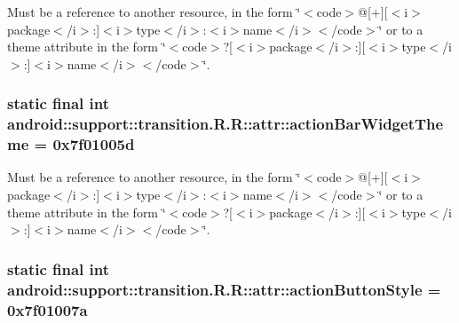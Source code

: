 Must be a reference to another resource, in the form \char`\"{}$<$code$>$@\mbox{[}+\mbox{]}\mbox{[}$<$i$>$package$<$/i$>$:\mbox{]}$<$i$>$type$<$/i$>$:$<$i$>$name$<$/i$>$$<$/code$>$\char`\"{} or to a theme attribute in the form \char`\"{}$<$code$>$?\mbox{[}$<$i$>$package$<$/i$>$:\mbox{]}\mbox{[}$<$i$>$type$<$/i$>$:\mbox{]}$<$i$>$name$<$/i$>$$<$/code$>$\char`\"{}. \hypertarget{classandroid_1_1support_1_1transition_1_1_r_1_1attr_79c3a0b3af1dfeaa7ed9bc597c8f0468}{
\subsubsection[{actionBarWidgetTheme}]{\setlength{\rightskip}{0pt plus 5cm}static final int android::support::transition.R.R::attr::actionBarWidgetTheme = 0x7f01005d}}
\label{classandroid_1_1support_1_1transition_1_1_r_1_1attr_79c3a0b3af1dfeaa7ed9bc597c8f0468}


Must be a reference to another resource, in the form \char`\"{}$<$code$>$@\mbox{[}+\mbox{]}\mbox{[}$<$i$>$package$<$/i$>$:\mbox{]}$<$i$>$type$<$/i$>$:$<$i$>$name$<$/i$>$$<$/code$>$\char`\"{} or to a theme attribute in the form \char`\"{}$<$code$>$?\mbox{[}$<$i$>$package$<$/i$>$:\mbox{]}\mbox{[}$<$i$>$type$<$/i$>$:\mbox{]}$<$i$>$name$<$/i$>$$<$/code$>$\char`\"{}. \hypertarget{classandroid_1_1support_1_1transition_1_1_r_1_1attr_2bd3bc6d4d37c8dc34a0800a5ab2600d}{
\subsubsection[{actionButtonStyle}]{\setlength{\rightskip}{0pt plus 5cm}static final int android::support::transition.R.R::attr::actionButtonStyle = 0x7f01007a}}
\label{classandroid_1_1support_1_1transition_1_1_r_1_1attr_2bd3bc6d4d37c8dc34a0800a5ab2600d}


